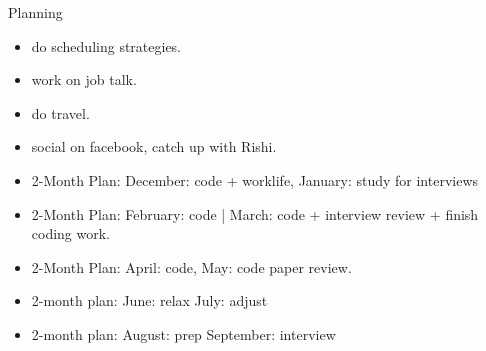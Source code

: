 \begin{block}{Planning} 

\begin{itemize}
\tiny \item \tiny do scheduling strategies. 
\item \tiny work on job talk. 
\item \tiny do travel. 
\item \tiny social on facebook, catch up with Rishi. 
\end{itemize} 
\begin{itemize} 
\tiny \item \tiny 2-Month Plan: December: code + worklife, January: study for interviews
\item \tiny 2-Month Plan: February: code | March:  code + interview review + finish coding work. 
\item \tiny 2-Month Plan: April: code, May: code paper review.
\item \tiny 2-month plan: June: relax July: adjust 
\item \tiny 2-month plan: August:  prep September: interview 
\end{itemize} 

\end{block}

